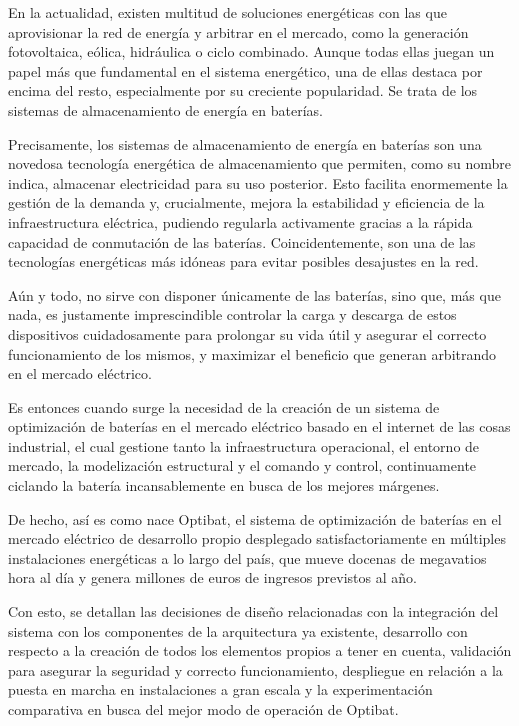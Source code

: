 En la actualidad, existen multitud de soluciones energéticas con las que aprovisionar la red de energía y arbitrar en el mercado, como la generación fotovoltaica, eólica, hidráulica o ciclo combinado. Aunque todas ellas juegan un papel más que fundamental en el sistema energético, una de ellas destaca por encima del resto, especialmente por su creciente popularidad. Se trata de los sistemas de almacenamiento de energía en baterías.

Precisamente, los sistemas de almacenamiento de energía en baterías son una novedosa tecnología energética de almacenamiento que permiten, como su nombre indica, almacenar electricidad para su uso posterior. Esto facilita enormemente la gestión de la demanda y, crucialmente, mejora la estabilidad y eficiencia de la infraestructura eléctrica, pudiendo regularla activamente gracias a la rápida capacidad de conmutación de las baterías. Coincidentemente, son una de las tecnologías energéticas más idóneas para evitar posibles desajustes en la red.

Aún y todo, no sirve con disponer únicamente de las baterías, sino que, más que nada, es justamente imprescindible controlar la carga y descarga de estos dispositivos cuidadosamente para prolongar su vida útil y asegurar el correcto funcionamiento de los mismos, y maximizar el beneficio que generan arbitrando en el mercado eléctrico.

Es entonces cuando surge la necesidad de la creación de un sistema de optimización de baterías en el mercado eléctrico basado en el internet de las cosas industrial, el cual gestione tanto la infraestructura operacional, el entorno de mercado, la modelización estructural y el comando y control, continuamente ciclando la batería incansablemente en busca de los mejores márgenes.

De hecho, así es como nace Optibat, el sistema de optimización de baterías en el mercado eléctrico de desarrollo propio desplegado satisfactoriamente en múltiples instalaciones energéticas a lo largo del país, que mueve docenas de megavatios hora al día y genera millones de euros de ingresos previstos al año.

Con esto, se detallan las decisiones de diseño relacionadas con la integración del sistema con los componentes de la arquitectura ya existente, desarrollo con respecto a la creación de todos los elementos propios a tener en cuenta, validación para asegurar la seguridad y correcto funcionamiento, despliegue en relación a la puesta en marcha en instalaciones a gran escala y la experimentación comparativa en busca del mejor modo de operación de Optibat.

